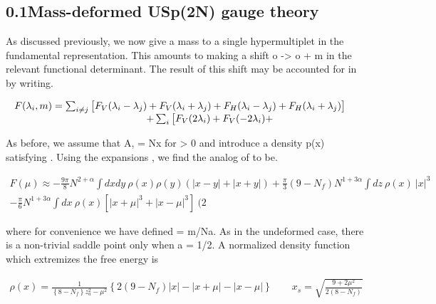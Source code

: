 \documentclass{article}
\begin{document}
\sloppy

\subsection*{0.1Mass-deformed USp(2N) gauge theory}


As discussed previously, we now give a mass to a single hypermultiplet in the fundamental
representation. This amounts to making a shift o -> o + m in the relevant functional
determinant. The result of this shift may be accounted for in by writing.


\begin{equation}
\begin{array} { c c } { F ( \lambda _ { i }, m ) = \sum _ { i \neq j } \big [ F _ { V } ( \lambda _ { i } - \lambda _ { j } ) + F _ { V } ( \lambda _ { i } + \lambda _ { j } ) + F _ { H } ( \lambda _ { i } - \lambda _ { j } ) + F _ { H } ( \lambda _ { i } + \lambda _ { j } ) \big ] } & { } \\ { \qquad \qquad \qquad + \sum _ { i } \big [ F _ { V } ( 2 \lambda _ { i } ) + F _ { V } ( - 2 \lambda _ { i } ) +}\end{array}
\end{equation}


As before, we assume that A, = Nx for  > 0 and introduce a density p(x) satisfying .
Using the expansions , we find the analog of to be.


\begin{equation}
\begin{array} { r } { F ( \mu ) \approx - \frac { 9 \pi } { 8 } N ^ { 2 + \alpha } \int d x d y ~ \rho ( x ) \rho ( y ) \left ( | x - y | + | x + y | \right ) + \frac { \pi } { 3 } ( 9 - N _ { f } ) N ^ { 1 + 3 \alpha } \int d z ~ \rho ( x ) ~ | x | ^ { 3 } } \\ { - \frac { \pi } { 6 } N ^ { 1 + 3 \alpha } \int d x ~ \rho ( x ) \left [ | x + \mu | ^ { 3 } + | x - \mu | ^ { 3 } \right ] ~ ( 2}\end{array}
\end{equation}


where for convenience we have defined  = m/Na. As in the undeformed case, there is a
non-trivial saddle point only when a = 1/2. A normalized density function which extremizes
the free energy is


\begin{equation}
\begin{array} { r } { \rho ( x ) = \frac { 1 } { \left \{ 8 - N _ { f } \right \} z _ { a } ^ { 2 } - \mu ^ { 2 } } \left \{ 2 ( 9 - N _ { f } ) | x | - | x + \mu | - | x - \mu | \right \} \qquad x _ { s } = \sqrt { \frac { 9 + 2 \mu ^ { 2 } } { 2 ( 8 - N _ { f } ) } } \qquad }\end{array}
\end{equation}
\end{document}
